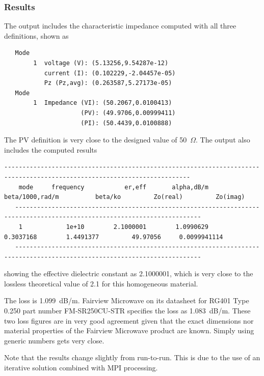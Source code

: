 \documentclass[titlepage]{article}
\renewcommand\_{\textunderscore\linebreak[1]}
\begin{document}
\subsubsection{Results}

The output includes the characteristic impedance computed with all three definitions, shown as
\begin{Verbatim}
   Mode
        1  voltage (V): (5.13256,9.54287e-12)
           current (I): (0.102229,-2.04457e-05)
           Pz (Pz,avg): (0.263587,5.27173e-05)
   Mode
        1  Impedance (VI): (50.2067,0.0100413)
                     (PV): (49.9706,0.00999411)
                     (PI): (50.4439,0.0100888)
\end{Verbatim}
The PV definition is very close to the designed value of 50~$\Omega$. The output also includes the computed results
\begin{Verbatim}[fontsize=\scriptsize]
   -------------------------------------------------------------------------------------------------------------------------
    mode     frequency           er,eff       alpha,dB/m  beta/1000,rad/m          beta/ko         Zo(real)         Zo(imag)
   -------------------------------------------------------------------------------------------------------------------------
    1            1e+10        2.1000001        1.0990629        0.3037168        1.4491377         49.97056     0.0099941114
   -------------------------------------------------------------------------------------------------------------------------
\end{Verbatim}
\noindent showing the effective dielectric constant as 2.1000001, which is very close to the lossless theoretical value of 2.1 for this homogeneous material.

The loss is 1.099~dB/m. Fairview Microwave on its datasheet for RG401 Type 0.250 part number FM-SR250CU-STR specifies the loss as 1.083~dB/m.  These two loss figures are in very good agreement given that the exact dimensions nor material properties of the Fairview Microwave product are known.  Simply using generic numbers gets very close.

Note that the results change slightly from run-to-run.  This is due to the use of an iterative solution combined with MPI processing.
\end{document}

